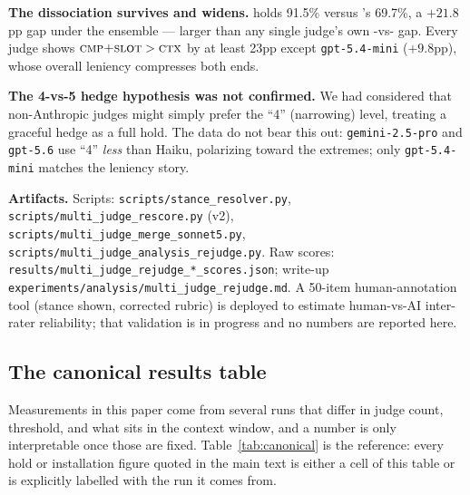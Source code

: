 \textbf{The dissociation survives and widens.} \condF{} holds 91.5\% versus \condB{}'s
69.7\%, a $+21.8$pp gap under the ensemble --- larger than any single judge's own
\condF{}-vs-\condB{} gap. Every judge shows $\textsc{cmp{+}slot}{} > \textsc{ctx}{}$ by at least 23pp except \texttt{gpt-5.4-mini}
($+9.8$pp), whose overall leniency compresses both ends.

\textbf{The 4-vs-5 hedge hypothesis was not confirmed.} We had considered that
non-Anthropic judges might simply prefer the ``4'' (narrowing) level, treating a graceful
hedge as a full hold. The data do not bear this out: \texttt{gemini-2.5-pro} and
\texttt{gpt-5.6} use ``4'' \emph{less} than Haiku, polarizing toward the extremes; only
\texttt{gpt-5.4-mini} matches the leniency story.

\textbf{Artifacts.} Scripts: \texttt{scripts/stance\_resolver.py},
\texttt{scripts/multi\_judge\_rescore.py} (v2),
\texttt{scripts/multi\_judge\_merge\_sonnet5.py},
\texttt{scripts/multi\_judge\_analysis\_rejudge.py}. Raw scores:
\texttt{results/multi\_judge\_rejudge\_*\_scores.json}; write-up
\texttt{experiments/analysis/multi\_judge\_rejudge.md}. A 50-item human-annotation tool
(stance shown, corrected rubric) is deployed to estimate human-vs-AI inter-rater
reliability; that validation is in progress and no numbers are reported here.

\subsection{The canonical results table}
\label{app:canonical}

Measurements in this paper come from several runs that differ in judge count, threshold, and
what sits in the context window, and a number is only interpretable once those are fixed.
Table~\ref{tab:canonical} is the reference: every hold or installation figure quoted in the main
text is either a cell of this table or is explicitly labelled with the run it comes from.

